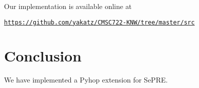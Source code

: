 \documentclass[11pt]{article} %
\begin{document}
Our implementation is available online at
\begin{center}
\href{https://github.com/yakatz/CMSC722-KNW/tree/master/src}
{\tt https://github.com/yakatz/CMSC722-KNW/tree/master/src}
\end{center}


\section{Conclusion}

We have implemented a Pyhop extension for SePRE.



\end{document}
